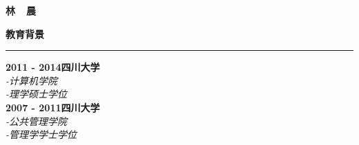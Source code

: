 \documentclass[a4paper,12pt,final]{memoir}
\newcommand{\myThemeColor}{RoyalBlue}
\newcommand{\SmallSep}{\vspace{0.9em}}
\newcommand{\CVSection}[1]
	{\Large\textbf{#1}\par
	\vspace{0.2cm}\normalsize\normalfont}
\newcommand{\CVItem}[1]
	{\textbf{\color{\myThemeColor} #1}}
\begin{document}
\begin{CJK*}{UTF8}{gbsn}
\Huge\bfseries {\color{\myThemeColor} 林~~晨}\\
\normalsize\normalfont

\CVSection{教育背景}
\hrule
\SmallSep
\CVItem{2011 - 2014\hfill\textsc{四川大学}}\\
\textit{-计算机学院}\\
\textit{-理学硕士学位}
\\
\CVItem{2007 - 2011\hfill\textsc{四川大学}}\\
\textit{-公共管理学院}\\
\textit{-管理学学士学位}\\


\end{CJK*}
\end{document}
